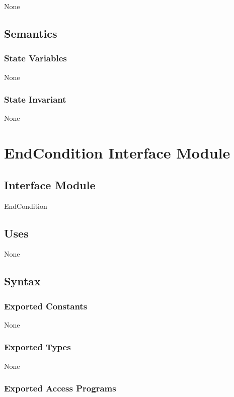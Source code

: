 \documentclass[12pt]{article}
\begin{document}
None

\subsection* {Semantics}

\subsubsection* {State Variables}

None

\subsubsection* {State Invariant}

None

\newpage

\section* {EndCondition Interface Module}

\subsection* {Interface Module}

EndCondition

\subsection*{Uses}

None

\subsection* {Syntax}

\subsubsection*{Exported Constants}

None

\subsubsection*{Exported Types}

None

\subsubsection* {Exported Access Programs}
\end{document}

